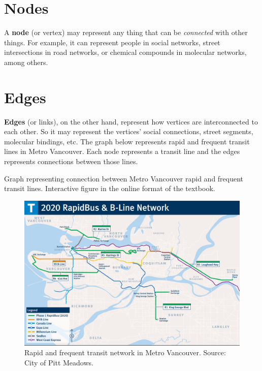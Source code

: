 \documentclass[
]{book}
\begin{document}
\hypertarget{nodes}{%
\section{Nodes}\label{nodes}}

A \textbf{node} (or vertex) may represent any thing that can be \emph{connected} with other things. For example, it can represent people in social networks, street intersections in road networks, or chemical compounds in molecular networks, among others.

\hypertarget{edges}{%
\section{Edges}\label{edges}}

\textbf{Edges} (or links), on the other hand, represent how vertices are interconnected to each other. So it may represent the vertices' social connections, street segments, molecular bindings, etc. The graph below represents rapid and frequent transit lines in Metro Vancouver. Each node represents a transit line and the edges represents connections between those lines.

\label{fig:unnamed-chunk-9}Graph representing connection between Metro Vancouver rapid and frequent transit lines. Interactive figure in the online format of the textbook.

\begin{figure}
\includegraphics[width=15.93in]{images/08-metro_vancouver_transit_network} \caption{Rapid and frequent transit network in Metro Vancouver. Source: City of Pitt Meadows.}\label{fig:unnamed-chunk-10}
\end{figure}
\end{document}
